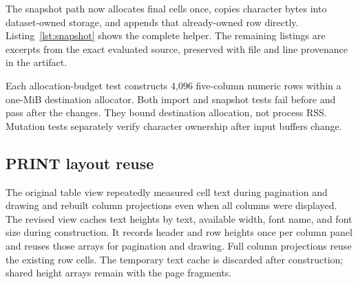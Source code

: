 \documentclass[11pt,a4paper]{article}
\begin{document}
The snapshot path now allocates final cells once, copies character
bytes into dataset-owned storage, and appends that already-owned
row directly. Listing~\ref{lst:snapshot} shows the complete helper.
The remaining listings are excerpts from the exact evaluated
source, preserved with file and line provenance in the artifact.

\noindent\begin{minipage}{\linewidth}

\end{minipage}

\noindent\begin{minipage}{\linewidth}

\end{minipage}

\noindent\begin{minipage}{\linewidth}

\end{minipage}

Each allocation-budget test constructs 4,096 five-column numeric
rows within a one-MiB destination allocator. Both import and
snapshot tests fail before and pass after the changes. They bound
destination allocation, not process RSS. Mutation tests separately
verify character ownership after input buffers change.

\subsection{PRINT layout reuse}

The original table view repeatedly measured cell text during
pagination and drawing and rebuilt column projections even
when all columns were displayed. The revised view caches text
heights by text, available width, font name, and font size during
construction. It records header and row heights once per column
panel and reuses those arrays for pagination and drawing. Full
column projections reuse the existing row cells. The temporary
text cache is discarded after construction; shared height arrays
remain with the page fragments.
\end{document}
